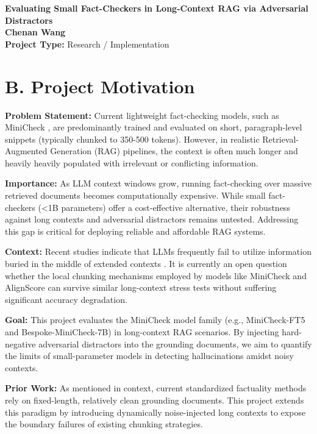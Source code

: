 \documentclass[12pt, letterpaper]{article}
\begin{document}
\begin{center}
    \textbf{\Large Evaluating Small Fact-Checkers in Long-Context RAG via Adversarial Distractors} \\
    \vspace{0.5em}
    \textbf{Chenan Wang} \\
    \textbf{Project Type:} Research / Implementation
\end{center}

\vspace{1em}

\section*{B. Project Motivation}

\textbf{Problem Statement:} Current lightweight fact-checking models, such as MiniCheck \cite{tang2024minicheck}, are predominantly trained and evaluated on short, paragraph-level snippets (typically chunked to 350-500 tokens). However, in realistic Retrieval-Augmented Generation (RAG) pipelines, the context is often much longer and heavily heavily populated with irrelevant or conflicting information.

\textbf{Importance:} As LLM context windows grow, running fact-checking over massive retrieved documents becomes computationally expensive. While small fact-checkers (<1B parameters) offer a cost-effective alternative, their robustness against long contexts and adversarial distractors remains untested. Addressing this gap is critical for deploying reliable and affordable RAG systems.

\textbf{Context:} Recent studies indicate that LLMs frequently fail to utilize information buried in the middle of extended contexts \cite{laban2024summary}. It is currently an open question whether the local chunking mechanisms employed by models like MiniCheck \cite{tang2024minicheck} and AlignScore \cite{zha2023alignscore} can survive similar long-context stress tests without suffering significant accuracy degradation.

\textbf{Goal:} This project evaluates the MiniCheck model family (e.g., MiniCheck-FT5 and Bespoke-MiniCheck-7B) in long-context RAG scenarios. By injecting hard-negative adversarial distractors into the grounding documents, we aim to quantify the limits of small-parameter models in detecting hallucinations amidst noisy contexts.

\textbf{Prior Work:} As mentioned in context, current standardized factuality methods \cite{zha2023alignscore,tang2024minicheck} rely on fixed-length, relatively clean grounding documents. This project extends this paradigm by introducing dynamically noise-injected long contexts to expose the boundary failures of existing chunking strategies.
\end{document}
